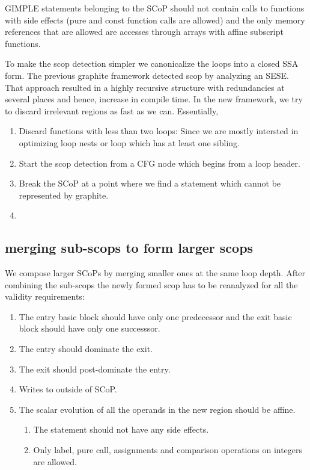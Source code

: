 \documentclass{sigplanconf}
\begin{document}
GIMPLE statements belonging to the SCoP should not contain calls to functions with
side effects (pure and const function calls are allowed) and the only memory references
that are allowed are accesses through arrays with affine subscript functions.

To make the scop detection simpler we canonicalize the loops into a closed SSA form.
The previous graphite framework detected scop by analyzing an SESE. That approach resulted in a highly recursive structure
with redundancies at several places and hence, increase in compile time. In the new framework, we try to discard irrelevant
regions as fast as we can. Essentially,
\begin{enumerate}
\item Discard functions with less than two loops: Since we are mostly intersted in optimizing loop nests
or loop which has at least one sibling.
\item Start the scop detection from a CFG node which begins from a loop header.
\item Break the SCoP at a point where we find a statement which cannot be represented by graphite.
\item 
\end{enumerate}


\subsection{merging sub-scops to form larger scops}
We compose larger SCoPs by merging smaller ones at the same loop depth. After combining the sub-scops
the newly formed scop has to be reanalyzed for all the validity requirements:
\begin{enumerate}
  \item The entry basic block should have only one predecessor and the exit basic block should have only one
    successsor.
  \item The entry should dominate the exit.
  \item The exit should post-dominate the entry.
  \item Writes to outside of SCoP.
  \item The scalar evolution of all the operands in the new region should be affine.

    \begin{enumerate}
      \item The statement should not have any side effects.
      \item Only label, pure call, assignments and comparison operations on integers are allowed.
    \end{enumerate}
\end{enumerate}
\end{document}
